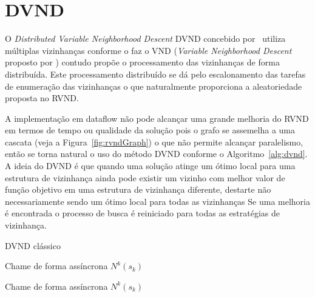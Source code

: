 \section{DVND} \label{sec:dvndClassico}

O \textit{Distributed Variable Neighborhood Descent} DVND concebido por~\cite{RIOS201839} utiliza múltiplas vizinhanças conforme o faz o VND (\textit{Variable Neighborhood Descent} proposto por \cite{mladenovic1997}) contudo propõe o processamento das vizinhanças de forma distribuída.
Este processamento distribuído se dá pelo escalonamento das tarefas de enumeração das vizinhanças o que naturalmente proporciona a aleatoriedade proposta no RVND.

A implementação em dataflow não pode alcançar uma grande melhoria do RVND em termos de tempo ou qualidade da solução pois o grafo se assemelha a uma cascata (veja a Figura~\ref{fig:rvndGraph}) o que não permite alcançar paralelismo, então se torna natural o uso do método DVND conforme o Algoritmo~\ref{alg:dvnd}. 
A ideia do DVND é que quando uma solução atinge um ótimo local para uma estrutura de vizinhança ainda pode existir um vizinho com melhor valor de função objetivo em uma estrutura de vizinhança diferente, destarte não necessariamente sendo um ótimo local para todas as vizinhanças
Se uma melhoria é encontrada o processo de busca é reiniciado para todas as estratégias de vizinhança.

\begin{algorithm}[htpb]
\caption{DVND clássico}\label{alg:dvnd}
\begin{algorithmic}[1]
             
             
             
            \State Chame de forma assíncrona $N^k(s_k)$
        \EndFor
        
             
            \EndIf
            
                    
                    \State Chame de forma assíncrona $N^k(s_k)$
                \EndIf
            \EndFor
        \EndWhile
    \EndFunction
\end{algorithmic}
\end{algorithm}

